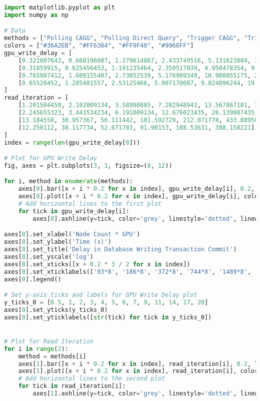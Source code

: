 \begin{lstlisting}[language=Python]
import matplotlib.pyplot as plt
import numpy as np

# Data
methods = ["Polling CAGG", "Polling Direct Query", "Trigger CAGG", "Trigger in Memory"]
colors = ["#36A2EB", "#FF6384", "#FF9F40", "#9966FF"]
gpu_write_delay = [
    [0.321007643, 0.660196607, 1.279614867, 2.433749516, 5.131623884, 11.624568741],
    [0.31859915, 0.625456453, 1.191235464, 2.350517039, 4.958478354, 9.977873813],
    [0.765987412, 1.609155407, 2.73052539, 5.176909349, 10.908855175, 20.96940738],
    [0.65528452, 1.285481557, 2.53125466, 5.007170087, 9.824896244, 19.604722893]
]
read_iteration = [
    [1.201504459, 2.102009134, 3.58900885, 7.282948943, 13.567867101, 18.581255946],
    [2.245655323, 3.443534234, 6.191009134, 12.676023435, 26.139007435, 55.204802484],
    [13.184558, 30.957367, 56.111442, 101.592729, 212.071778, 433.089509],
    [12.250112, 30.117734, 52.671703, 91.90153, 188.53631, 388.158221]
]
index = range(len(gpu_write_delay[0]))

# Plot for GPU Write Delay
fig, axes = plt.subplots(3, 1, figsize=(8, 12))

for i, method in enumerate(methods):
    axes[0].bar([x + i * 0.2 for x in index], gpu_write_delay[i], 0.2, label=method, color=colors[i])
    axes[0].plot([x + i * 0.2 for x in index], gpu_write_delay[i], color=colors[i], marker='o', linewidth=1, markersize=2)
    # Add horizontal lines to the first plot
    for tick in gpu_write_delay[i]:
        axes[0].axhline(y=tick, color='grey', linestyle='dotted', linewidth=0.3)

axes[0].set_xlabel('Node Count * GPU')
axes[0].set_ylabel('Time (s)')
axes[0].set_title('Delay in Database Writing Transaction Commit')
axes[0].set_yscale('log')
axes[0].set_xticks([x + 0.2 * 3 / 2 for x in index])
axes[0].set_xticklabels(['93*8', '186*8', '372*8', '744*8', '1489*8', '2978*8'])
axes[0].legend()

# Set y-axis ticks and labels for GPU Write Delay plot
y_ticks_0 = [0.5, 1, 2, 3, 4, 5, 6, 7, 9, 11, 14, 17, 20]
axes[0].set_yticks(y_ticks_0)
axes[0].set_yticklabels([str(tick) for tick in y_ticks_0])


# Plot for Read Iteration
for i in range(2):
    method = methods[i]
    axes[1].bar([x + i * 0.2 for x in index], read_iteration[i], 0.2, label=method, color=colors[i])
    axes[1].plot([x + i * 0.2 for x in index], read_iteration[i], color=colors[i], marker='o', linewidth=1, markersize=2)
    # Add horizontal lines to the second plot
    for tick in read_iteration[i]:
        axes[1].axhline(y=tick, color='grey', linestyle='dotted', linewidth=0.3)


\end{lstlisting}
